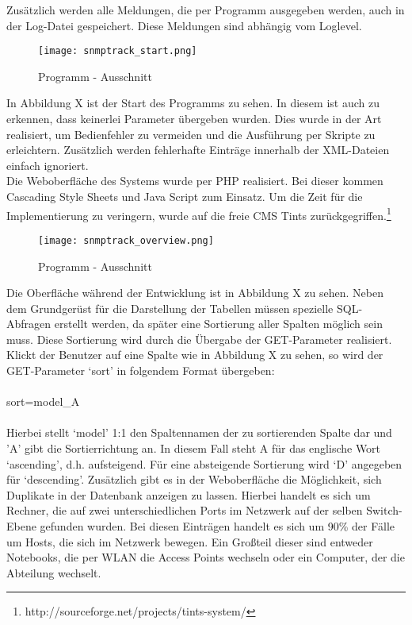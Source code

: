 Zusätzlich werden alle Meldungen, die per Programm ausgegeben werden, auch in der Log-Datei gespeichert.
Diese Meldungen sind abhängig vom Loglevel.
\\
\begin{figure}[H]
\centering
\texttt{[image: snmptrack\_start.png]}
\caption{Programm - Ausschnitt}
\label{fig:show_s1_s2_p1_n1}
\end{figure}
In Abbildung X ist der Start des Programms zu sehen. In diesem ist auch zu erkennen, dass keinerlei Parameter übergeben wurden. Dies wurde in der Art realisiert, um Bedienfehler zu vermeiden und die Ausführung per Skripte zu erleichtern.
Zusätzlich werden fehlerhafte Einträge innerhalb der XML-Dateien einfach ignoriert.\\
Die Weboberfläche des Systems wurde per PHP realisiert.
Bei dieser kommen Cascading Style Sheets und Java Script zum Einsatz.
Um die Zeit für die Implementierung zu veringern, wurde auf die freie CMS Tints zurückgegriffen.\footnote{http://sourceforge.net/projects/tints-system/}
\\
\begin{figure}[H]
\centering
\texttt{[image: snmptrack\_overview.png]}
\caption{Programm - Ausschnitt}
\label{fig:show_s1_s2_p1_n1}
\end{figure}
Die Oberfläche während der Entwicklung ist in Abbildung X zu sehen.
Neben dem Grundgerüst für die Darstellung der Tabellen müssen spezielle SQL-Abfragen erstellt werden, da später eine Sortierung aller Spalten möglich sein muss.
Diese Sortierung wird durch die Übergabe der GET-Parameter realisiert. Klickt der Benutzer auf eine Spalte wie in Abbildung X zu sehen, so wird der GET-Parameter ‘sort’ in folgendem Format übergeben:\\
\\
sort=model\_A\\
\\
Hierbei stellt ‘model’ 1:1 den Spaltennamen der zu sortierenden Spalte dar und 'A' gibt die Sortierrichtung an. In diesem Fall steht A für das englische Wort ‘ascending’, d.h. aufsteigend. Für eine absteigende Sortierung wird ‘D’ angegeben für ‘descending’.
Zusätzlich gibt es in der Weboberfläche die Möglichkeit, sich Duplikate in der Datenbank anzeigen zu lassen.
Hierbei handelt es sich um Rechner, die auf zwei unterschiedlichen Ports im Netzwerk auf der selben Switch-Ebene gefunden wurden.
Bei diesen Einträgen handelt es sich um 90\% der Fälle um Hosts, die sich im Netzwerk bewegen.
Ein Großteil dieser sind entweder Notebooks, die per WLAN die Access Points wechseln oder ein Computer, der die Abteilung wechselt.

